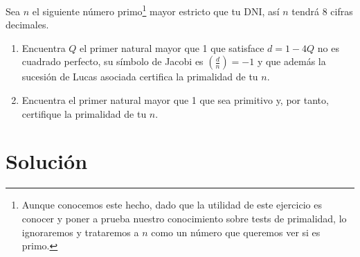 	Sea $n$ el siguiente número primo\footnote{Aunque conocemos este hecho, dado que la utilidad de este ejercicio
	es conocer y poner a prueba nuestro conocimiento sobre tests de primalidad, lo ignoraremos y trataremos a $n$
	como un número que queremos ver si es primo.} mayor estricto que tu DNI, así $n$ tendrá 8 cifras decimales.

	\begin{enumerate}
	\item Encuentra $Q$ el primer natural mayor que 1 que satisface $d=1-4Q$ no es cuadrado perfecto, su símbolo de
	Jacobi es $\displaystyle \left(\frac{d}{n}\right) = -1$ y que además la sucesión de Lucas asociada certifica
	la primalidad de tu $n$.
	\item Encuentra el primer natural mayor que 1 que sea primitivo y, por tanto, certifique la primalidad de tu $n$.
	\end{enumerate}

\section*{Solución}